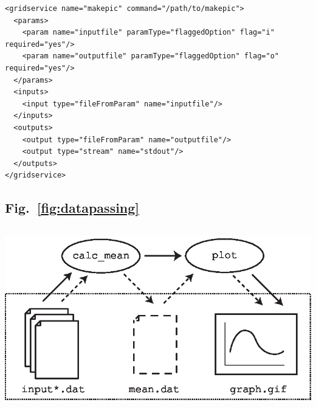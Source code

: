 \documentclass[a4paper]{article}
\begin{document}
\begin{verbatim}
<gridservice name="makepic" command="/path/to/makepic">
  <params>
    <param name="inputfile" paramType="flaggedOption" flag="i" required="yes"/>
    <param name="outputfile" paramType="flaggedOption" flag="o" required="yes"/>
  </params>
  <inputs>
    <input type="fileFromParam" name="inputfile"/>
  </inputs>
  <outputs>
    <output type="fileFromParam" name="outputfile"/>
    <output type="stream" name="stdout"/>
  </outputs>
</gridservice>
\end{verbatim}

\newpage

\subsection*{Fig.~\ref{fig:datapassing}}
\includegraphics[height=8cm]{datapassing.eps}
\end{document}

